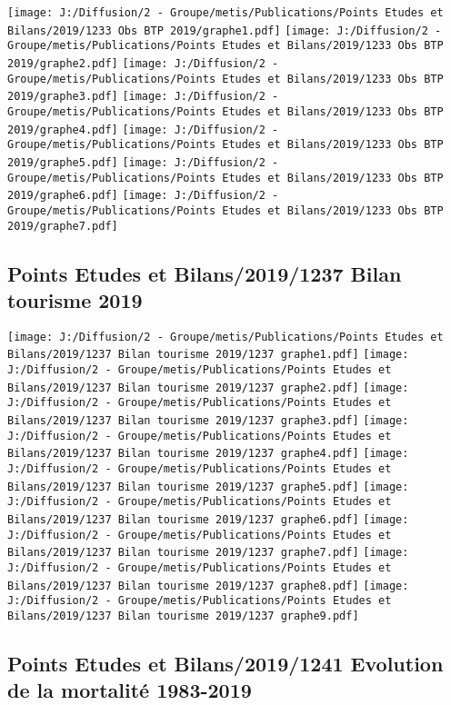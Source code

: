 \documentclass[
]{article}
\begin{document}
\texttt{[image: J:/Diffusion/2 - Groupe/metis/Publications/Points Etudes et Bilans/2019/1233 Obs BTP 2019/graphe1.pdf]}
\texttt{[image: J:/Diffusion/2 - Groupe/metis/Publications/Points Etudes et Bilans/2019/1233 Obs BTP 2019/graphe2.pdf]}
\texttt{[image: J:/Diffusion/2 - Groupe/metis/Publications/Points Etudes et Bilans/2019/1233 Obs BTP 2019/graphe3.pdf]}
\texttt{[image: J:/Diffusion/2 - Groupe/metis/Publications/Points Etudes et Bilans/2019/1233 Obs BTP 2019/graphe4.pdf]}
\texttt{[image: J:/Diffusion/2 - Groupe/metis/Publications/Points Etudes et Bilans/2019/1233 Obs BTP 2019/graphe5.pdf]}
\texttt{[image: J:/Diffusion/2 - Groupe/metis/Publications/Points Etudes et Bilans/2019/1233 Obs BTP 2019/graphe6.pdf]}
\texttt{[image: J:/Diffusion/2 - Groupe/metis/Publications/Points Etudes et Bilans/2019/1233 Obs BTP 2019/graphe7.pdf]}

\hypertarget{points-etudes-et-bilans20191237-bilan-tourisme-2019}{%
\subsection{Points Etudes et Bilans/2019/1237 Bilan tourisme
2019}\label{points-etudes-et-bilans20191237-bilan-tourisme-2019}}

\texttt{[image: J:/Diffusion/2 - Groupe/metis/Publications/Points Etudes et Bilans/2019/1237 Bilan tourisme 2019/1237 graphe1.pdf]}
\texttt{[image: J:/Diffusion/2 - Groupe/metis/Publications/Points Etudes et Bilans/2019/1237 Bilan tourisme 2019/1237 graphe2.pdf]}
\texttt{[image: J:/Diffusion/2 - Groupe/metis/Publications/Points Etudes et Bilans/2019/1237 Bilan tourisme 2019/1237 graphe3.pdf]}
\texttt{[image: J:/Diffusion/2 - Groupe/metis/Publications/Points Etudes et Bilans/2019/1237 Bilan tourisme 2019/1237 graphe4.pdf]}
\texttt{[image: J:/Diffusion/2 - Groupe/metis/Publications/Points Etudes et Bilans/2019/1237 Bilan tourisme 2019/1237 graphe5.pdf]}
\texttt{[image: J:/Diffusion/2 - Groupe/metis/Publications/Points Etudes et Bilans/2019/1237 Bilan tourisme 2019/1237 graphe6.pdf]}
\texttt{[image: J:/Diffusion/2 - Groupe/metis/Publications/Points Etudes et Bilans/2019/1237 Bilan tourisme 2019/1237 graphe7.pdf]}
\texttt{[image: J:/Diffusion/2 - Groupe/metis/Publications/Points Etudes et Bilans/2019/1237 Bilan tourisme 2019/1237 graphe8.pdf]}
\texttt{[image: J:/Diffusion/2 - Groupe/metis/Publications/Points Etudes et Bilans/2019/1237 Bilan tourisme 2019/1237 graphe9.pdf]}

\hypertarget{points-etudes-et-bilans20191241-evolution-de-la-mortalituxe9-1983-2019}{%
\subsection{Points Etudes et Bilans/2019/1241 Evolution de la mortalité
1983-2019}\label{points-etudes-et-bilans20191241-evolution-de-la-mortalituxe9-1983-2019}}
\end{document}
